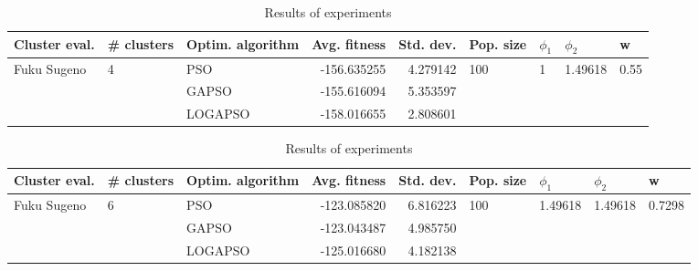 \documentclass{article}
\begin{document}
\begin{table}
\centering
\caption{Results of experiments}
\begin{tabular}{lllrrllll}
\toprule
               Cluster eval. &        \# clusters & Optim. algorithm &  Avg. fitness &  Std. dev. &            Pop. size &         $\phi_{1}$ &               $\phi_{2}$ &                     w \\
\midrule
\multirow{3}{*}{Fuku Sugeno} & \multirow{3}{*}{4} &              PSO &   -156.635255 &   4.279142 & \multirow{3}{*}{100} & \multirow{3}{*}{1} & \multirow{3}{*}{1.49618} & \multirow{3}{*}{0.55} \\
                             &                    &            GAPSO &   -155.616094 &   5.353597 &                      &                    &                          &                       \\
                             &                    &          LOGAPSO &   -158.016655 &   2.808601 &                      &                    &                          &                       \\
\bottomrule
\end{tabular}
\end{table}
\begin{table}
\centering
\caption{Results of experiments}
\begin{tabular}{lllrrllll}
\toprule
               Cluster eval. &        \# clusters & Optim. algorithm &  Avg. fitness &  Std. dev. &            Pop. size &               $\phi_{1}$ &               $\phi_{2}$ &                       w \\
\midrule
\multirow{3}{*}{Fuku Sugeno} & \multirow{3}{*}{6} &              PSO &   -123.085820 &   6.816223 & \multirow{3}{*}{100} & \multirow{3}{*}{1.49618} & \multirow{3}{*}{1.49618} & \multirow{3}{*}{0.7298} \\
                             &                    &            GAPSO &   -123.043487 &   4.985750 &                      &                          &                          &                         \\
                             &                    &          LOGAPSO &   -125.016680 &   4.182138 &                      &                          &                          &                         \\
\bottomrule
\end{tabular}
\end{table}
\end{document}
